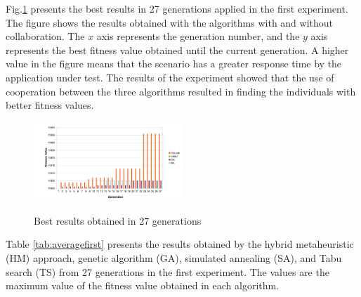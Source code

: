 \documentclass[conference]{IEEEtran}
\begin{document}
Fig.\ref{fig:exp1bestresults} presents the best results in 27 generations applied in the first experiment. The figure shows the results obtained with the algorithms with and without collaboration. The $x$ axis  represents the generation number, and the $y$ axis represents the best fitness value obtained until the current generation.
A higher value in the figure means that the scenario has a greater response time by the application under test. The results of the experiment showed that the use of cooperation between the three algorithms resulted in finding the individuals with better fitness values.

\begin{figure}[h]
\centering
\caption{Best results obtained in 27 generations}
\includegraphics[width=0.5\textwidth]{./images/generationcomparative.png}
\label{fig:exp1bestresults}
\end{figure}

Table \ref{tab:averagefirst} presents the results obtained by the hybrid metaheuristic (HM) approach, genetic algorithm (GA), simulated annealing (SA), and Tabu search (TS) from 27 generations in the first experiment. The values are the maximum value of the fitness value obtained in each algorithm. 
\end{document}
